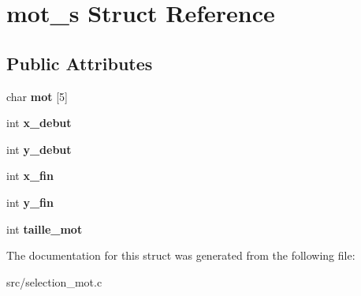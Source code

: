 \hypertarget{structmot__s}{}\section{mot\+\_\+s Struct Reference}
\label{structmot__s}
\subsection*{Public Attributes}
\begin{DoxyCompactItemize}
\item 
\mbox{\label{structmot__s_abba1f34e0992c00674effacde3dd5bff}} 
char {\bfseries mot} \mbox{[}5\mbox{]}
\item 
\mbox{\label{structmot__s_abddc1db8a8b6063993e5418c5caf909c}} 
int {\bfseries x\+\_\+debut}
\item 
\mbox{\label{structmot__s_a44df185acfed1a9db5372740834f29ef}} 
int {\bfseries y\+\_\+debut}
\item 
\mbox{\label{structmot__s_a3a772a34ffcec44a9cce3167fcb669a0}} 
int {\bfseries x\+\_\+fin}
\item 
\mbox{\label{structmot__s_a1ef7fdda862c1a311439c37559c2ebdf}} 
int {\bfseries y\+\_\+fin}
\item 
\mbox{\label{structmot__s_ad6a926f0979f4cdee26cd0426bc7719c}} 
int {\bfseries taille\+\_\+mot}
\end{DoxyCompactItemize}


The documentation for this struct was generated from the following file\+:\begin{DoxyCompactItemize}
\item 
src/selection\+\_\+mot.\+c\end{DoxyCompactItemize}
